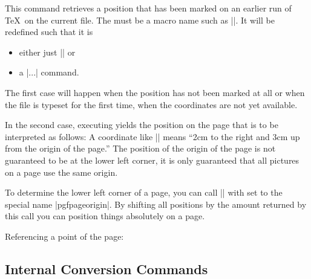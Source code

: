 \begin{command}{\pgfsys@getposition{}}
  This command retrieves a position that has been marked on an earlier
  run of \TeX\ on the current file. The  must be a macro
  name such as |\mymacro|. It will be redefined such that it is
  \begin{itemize}
  \item either just |\relax| or
  \item a |\pgfpoint...| command.
  \end{itemize}
  The first case will happen when the position has not been marked at
  all or when the file is typeset for the first time, when the
  coordinates are not yet available.

  In the second case, executing  yields the position on
  the page that is to be interpreted as follows: A coordinate like
  |\pgfpoint{2cm}{3cm}| means ``2cm to the right and 3cm up from the
  origin of the page.'' The position of the origin of the page is not
  guaranteed to be at the lower left corner, it is only guaranteed
  that all pictures on a page use the same origin.

  To determine the lower left corner of a page, you can call
  |\pgfsys@getposition| with  set to the special name
  |pgfpageorigin|. By shifting all positions by the amount returned by
  this call you can position things absolutely on a page.

  \example Referencing a point of the page:
\end{command}


\subsection{Internal Conversion Commands}

